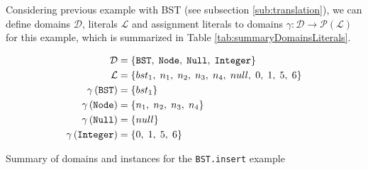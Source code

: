 \documentclass[11pt,twoside,a4paper]{book}
\begin{document}
Considering previous example with BST (see subsection \ref{sub:translation}), we
can define domains $\mathcal{D}$, literals $\mathcal{L}$ and assignment literals to domains
$\gamma : \mathcal{D} \rightarrow \mathcal{P}\left(\mathcal{L}\right)$ for this
example, which is summarized in Table \ref{tab:summaryDomainsLiterals}.

\begin{table}[ht]
\begin{center}
\begin{align*}
	\mathcal{D}& =\{\texttt{BST},\hspace{1mm} \texttt{Node},\hspace{1mm}
	\texttt{Null}, \hspace{1mm} \texttt{Integer}\}\\ 
	\mathcal{L}& =\{bst_1,\hspace{1mm} n_1,\hspace{1mm} n_2,\hspace{1mm}
	n_3,\hspace{1mm} n_4, \hspace{1mm} null,\hspace{1mm} 0,\hspace{1mm} 1,\hspace{1mm} 5,\hspace{1mm} 6\}\\
	\gamma\left(\texttt{BST}\right)& = \{bst_1\}\\
	\gamma\left(\texttt{Node}\right)& =
	\{n_1,\hspace{1mm}n_2,\hspace{1mm}n_3,\hspace{1mm}n_4\}\\
	\gamma\left(\texttt{Null}\right)& =
	\{null\}\\
	\gamma\left(\texttt{Integer}\right)& =
	\{0,\hspace{1mm}1,\hspace{1mm}5,\hspace{1mm}6\}\\
\end{align*}
\end{center}
\caption{Summary of domains and instances for the \texttt{BST.insert} example}
\label{tab:summaryDomainsLiterals}
\end{table}
\end{document}
